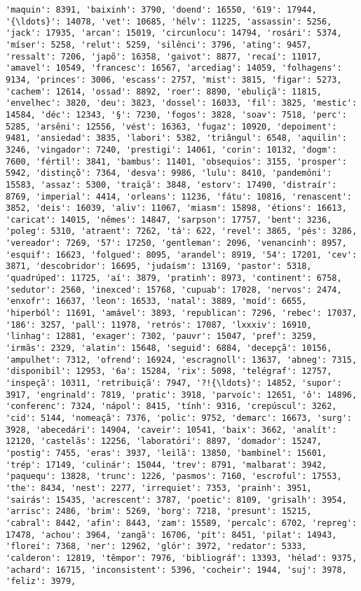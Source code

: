 \documentclass[11pt]{article}
\begin{document}
\begin{Verbatim}[commandchars=\\\{\}]
'maquin': 8391, 'baixinh': 3790, 'doend': 16550, '619': 17944, '{\ldots}': 14078, 'vet': 10685, 'hélv': 11225, 'assassin': 5256, 'jack': 17935, 'arcan': 15019, 'circunlocu': 14794, 'rosári': 5374, 'míser': 5258, 'relut': 5259, 'silênci': 3796, 'ating': 9457, 'ressalt': 7206, 'japõ': 16358, 'gaivot': 8877, 'recaí': 11017, 'amavel': 10549, 'francesc': 16567, 'arcediag': 14059, 'folhagens': 9134, 'princes': 3006, 'escass': 2757, 'mist': 3815, 'figar': 5273, 'cachem': 12614, 'ossad': 8892, 'roer': 8890, 'ebuliçã': 11815, 'envelhec': 3820, 'deu': 3823, 'dossel': 16033, 'fil': 3825, 'mestic': 14584, 'déc': 12343, '§': 7230, 'fogos': 3828, 'soav': 7518, 'perc': 5285, 'arsêni': 12556, 'vést': 16363, 'fugaz': 10920, 'depoiment': 9481, 'ansiedad': 3835, 'labori': 5382, 'triângul': 6548, 'aquilin': 3246, 'vingador': 7240, 'prestigi': 14061, 'corin': 10132, 'dogm': 7600, 'fértil': 3841, 'bambus': 11401, 'obsequios': 3155, 'prosper': 5942, 'distinçõ': 7364, 'desva': 9986, 'lulu': 8410, 'pandemôni': 15583, 'assaz': 5300, 'traiçã': 3848, 'estorv': 17490, 'distraír': 8769, 'imperial': 4414, 'orleans': 11236, 'fátu': 10816, 'renascent': 3852, 'deis': 16039, 'aliv': 11067, 'miasm': 15898, 'étions': 16613, 'caricat': 14015, 'nêmes': 14847, 'sarpson': 17757, 'bent': 3236, 'poleg': 5310, 'atraent': 7262, 'tá': 622, 'revel': 3865, 'pés': 3286, 'vereador': 7269, '57': 17250, 'gentleman': 2096, 'venancinh': 8957, 'esquif': 16623, 'folgued': 8095, 'arandel': 8919, '54': 17201, 'cev': 3871, 'descobridor': 16695, 'judaísm': 13169, 'pastor': 5318, 'quadrúped': 11725, 'aí': 3879, 'pratinh': 8973, 'continent': 6758, 'sedutor': 2560, 'inexced': 15768, 'cupuab': 17028, 'nervos': 2474, 'enxofr': 16637, 'leon': 16533, 'natal': 3889, 'moíd': 6655, 'hiperból': 11691, 'amável': 3893, 'republican': 7296, 'rebec': 17037, '186': 3257, 'pall': 11978, 'retrós': 17087, 'lxxxiv': 16910, 'linhag': 12881, 'exager': 7302, 'pauvr': 15047, 'pref': 3259, 'irmãs': 2329, 'alatin': 15648, 'seguid': 6884, 'decepçã': 10156, 'ampulhet': 7312, 'ofrend': 16924, 'escragnoll': 13637, 'abneg': 7315, 'disponibil': 12953, '6a': 15284, 'rix': 5098, 'telégraf': 12757, 'inspeçã': 10311, 'retribuiçã': 7947, '?!{\ldots}': 14852, 'supor': 3917, 'engrinald': 7819, 'pratic': 3918, 'parvoíc': 12651, 'ô': 14896, 'conferenc': 7324, 'nápol': 8415, 'tính': 9316, 'crepúscul': 3262, 'cid': 5144, 'nomeaçã': 7376, 'polic': 9752, 'demarc': 16673, 'surg': 3928, 'abecedári': 14904, 'caveir': 10541, 'baix': 3662, 'analít': 12120, 'castelãs': 12256, 'laboratóri': 8897, 'domador': 15247, 'postig': 7455, 'eras': 3937, 'leilã': 13850, 'bambinel': 15601, 'trép': 17149, 'culinár': 15044, 'trev': 8791, 'malbarat': 3942, 'paquequ': 13828, 'trunc': 1226, 'pasmos': 7160, 'escroful': 17553, 'the': 8434, 'nest': 2277, 'irrequiet': 7353, 'prainh': 3951, 'sairás': 15435, 'acrescent': 3787, 'poetic': 8109, 'grisalh': 3954, 'arrisc': 2486, 'brim': 5269, 'borg': 7218, 'presunt': 15215, 'cabral': 8442, 'afin': 8443, 'zam': 15589, 'percalc': 6702, 'repreg': 17478, 'achou': 3964, 'zangã': 16706, 'pít': 8451, 'pilat': 14943, 'florei': 7368, 'ner': 12962, 'glór': 3972, 'redator': 5333, 'calderon': 12819, 'têmpor': 7976, 'bibliográf': 13393, 'hélad': 9375, 'achard': 16715, 'inconsistent': 5396, 'cocheir': 1944, 'suj': 3978, 'feliz': 3979, 
\end{Verbatim}
\end{document}
